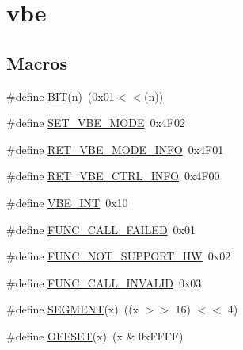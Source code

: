 \hypertarget{group__vbe}{}\section{vbe}
\label{group__vbe}
\subsection*{Macros}
\begin{DoxyCompactItemize}
\item 
\#define \mbox{\hyperlink{group__vbe_ga3a8ea58898cb58fc96013383d39f482c}{B\+IT}}(n)~(0x01$<$$<$(n))
\item 
\#define \mbox{\hyperlink{group__vbe_gab32156e1d72cb92b120bb16883c87eea}{S\+E\+T\+\_\+\+V\+B\+E\+\_\+\+M\+O\+DE}}~0x4\+F02
\item 
\#define \mbox{\hyperlink{group__vbe_ga8197e70eeb80a1f0cc36435458f43baf}{R\+E\+T\+\_\+\+V\+B\+E\+\_\+\+M\+O\+D\+E\+\_\+\+I\+N\+FO}}~0x4\+F01
\item 
\#define \mbox{\hyperlink{group__vbe_gad2b9e60cf16cf300fb5538fed61a0709}{R\+E\+T\+\_\+\+V\+B\+E\+\_\+\+C\+T\+R\+L\+\_\+\+I\+N\+FO}}~0x4\+F00
\item 
\#define \mbox{\hyperlink{group__vbe_ga0ab1b58dbc6c6d4c63156c11f0a4d854}{V\+B\+E\+\_\+\+I\+NT}}~0x10
\item 
\#define \mbox{\hyperlink{group__vbe_gac80fb38edf3a38ac5322ff07dcf8d892}{F\+U\+N\+C\+\_\+\+C\+A\+L\+L\+\_\+\+F\+A\+I\+L\+ED}}~0x01
\item 
\#define \mbox{\hyperlink{group__vbe_ga70496bc11110b7324b61691cb9539c39}{F\+U\+N\+C\+\_\+\+N\+O\+T\+\_\+\+S\+U\+P\+P\+O\+R\+T\+\_\+\+HW}}~0x02
\item 
\#define \mbox{\hyperlink{group__vbe_ga850928fe6587cfce16fce2d3aaec01f8}{F\+U\+N\+C\+\_\+\+C\+A\+L\+L\+\_\+\+I\+N\+V\+A\+L\+ID}}~0x03
\item 
\#define \mbox{\hyperlink{group__vbe_ga355fae1bcd41c31540b439bcae26ce65}{S\+E\+G\+M\+E\+NT}}(x)~((x $>$$>$ 16) $<$$<$ 4)
\item 
\#define \mbox{\hyperlink{group__vbe_gad12dce0a7bf9d908b172a28155b3d261}{O\+F\+F\+S\+ET}}(x)~(x \& 0x\+F\+F\+F\+F)
\end{DoxyCompactItemize}
